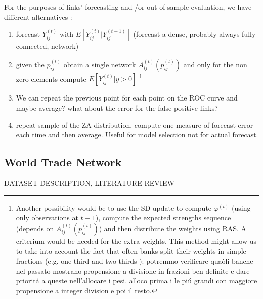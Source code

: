 \documentclass[a4paper,12pt]{article}
\newcommand{\tonde}[1]{\left(#1\right)}
\newcommand{\pq}[1]{\left[#1\right]}
\newcommand{\Yijt}{{Y_{ij}^{\tonde{t}}}}
\newcommand{\Yijtm}{{Y_{ij}^{\tonde{t - 1}}}}
\newcommand{\Aijt}{{A_{ij}^{\tonde{t}}}}
\newcommand{\et}{^{\tonde{t}}}
\newcommand{\uij}{_{ij}}
\begin{document}
For the purposes of links' forecasting and /or out of sample evaluation, we have different alternatives : 
\begin{enumerate}
	\item forecast $\Yijt$ with $E\pq{\Yijt\vert \Yijtm}$ (forecast a dense, probably always fully connected, network)
	\item given the $p\uij\et$ obtain a single network $\Aijt\tonde{p\uij\et}$ and  only for the non zero elements compute $E\pq{\Yijt\vert y>0 }$
	\footnote{Another possibility would be to use the SD update to compute $\varphi\et$ (using only observations at $t-1$),  compute the expected strengths sequence (depends on $\Aijt\tonde{p\uij\et}$) and then distribute the weights using RAS. A criterium would be needed for the extra weights. This method might allow us to take into account the fact that often banks split their weights in simple fractions (e.g. one third and two thirds  ): potremmo verificare quaòli banche nel passato mostrano propensione a divisione in frazioni ben definite e dare priorit\'a a queste nell'allocare i pesi. alloco prima i le pi\'u grandi con maggiore propensione a integer division e poi il resto.}
	\item We can repeat the previous point for each point on the ROC curve and maybe average?  what about the error for the false positive links? 
	\item repeat sample of the ZA distribution, compute one measure of forecast error each time and then average. Useful for model selection not for actual forecast.
\end{enumerate} 


\subsection{World Trade Network}
DATASET DESCRIPTION, LITERATURE REVIEW\\
\end{document}
